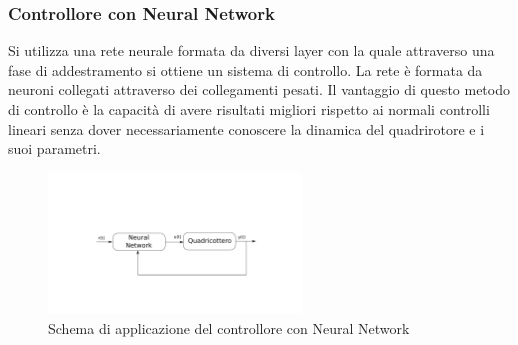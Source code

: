 \subsubsection{Controllore con Neural Network}

Si utilizza una rete neurale formata da diversi layer con la quale attraverso una fase di addestramento si ottiene un sistema di controllo. La rete è formata da neuroni collegati attraverso dei collegamenti pesati. Il vantaggio di questo metodo di controllo è la capacità di avere risultati migliori rispetto ai normali controlli lineari senza dover necessariamente conoscere la dinamica del quadrirotore e i suoi parametri.

\begin{figure}
	\centering
	\includegraphics[width=0.6\textwidth]{SistemaQuadrirotore/Figure/NN}
	\caption{Schema di applicazione del controllore con Neural Network}
\end{figure}
